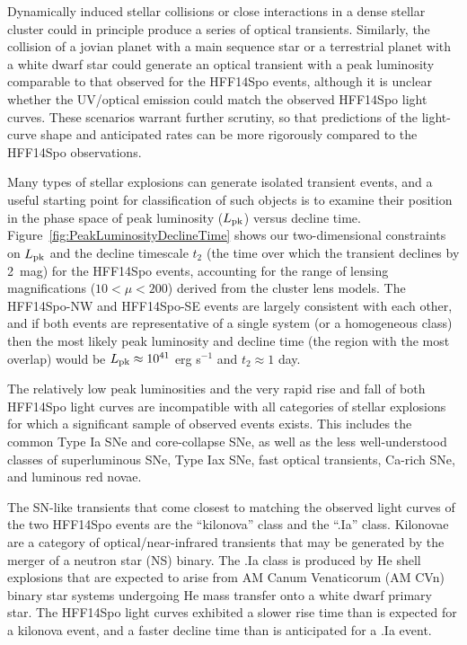 \documentclass{article}
\providecommand\citep{\cite}
\def\spock{HFF14Spo\xspace}
\def\spockone{HFF14Spo-NW\xspace}
\def\spocktwo{HFF14Spo-SE\xspace}
\def\Lpk{\ensuremath{L_{\rm pk}}\xspace}
\def\t2{\ensuremath{t_{2}}\xspace}
\begin{document}

Dynamically induced stellar collisions or close interactions in a
dense stellar cluster\citep{Fregeau:2004} could in principle produce a
series of optical transients. Similarly, the collision of a jovian
planet with a main sequence star\cite{Metzger:2012,Yamazaki:2017} or a
terrestrial planet with a white dwarf star\cite{Di-Stefano:2015} could
generate an optical transient with a peak luminosity comparable to
that observed for the \spock events, although it is unclear whether
the UV/optical emission could match the observed \spock light curves.
These scenarios warrant further scrutiny, so that predictions of the
light-curve shape and anticipated rates can be more rigorously
compared to the \spock observations.

Many types of stellar explosions can generate isolated transient
events, and a useful starting point for classification of such objects
is to examine their position in the phase space of peak luminosity
(\Lpk) versus decline time\cite{Kulkarni:2007}.
Figure~\ref{fig:PeakLuminosityDeclineTime} shows our two-dimensional
constraints on \Lpk and the decline timescale \t2 (the time over which
the transient declines by 2~mag) for the \spock events,
accounting for the range of lensing magnifications ($10<\mu<200$)
derived from the cluster lens models.  The \spockone and \spocktwo
events are largely consistent with each other, and if both events are
representative of a single system (or a homogeneous class) then the
most likely peak luminosity and decline time (the region with the most
overlap) would be $L_{\rm pk}\approx10^{41}$ erg s$^{-1}$ and $t_2\approx1$
day.

The relatively low peak luminosities and the very rapid rise and fall
of both \spock light curves are incompatible with all categories of
stellar explosions for which a significant sample of observed events
exists.  This includes the common Type Ia SNe and core-collapse SNe,
as well as the less well-understood classes of superluminous
SNe\cite{Gal-Yam:2012}, Type Iax SNe\citep{Foley:2013a}, fast optical
transients\cite{Drout:2014}, Ca-rich SNe\cite{Kasliwal:2012}, and
luminous red novae\cite{Kulkarni:2007}.  


The SN-like transients that come closest to matching the observed
light curves of the two \spock events are the ``kilonova'' class and
the ``.Ia'' class.  Kilonovae are a category of optical/near-infrared
transients that may be generated by the merger of a neutron star (NS)
binary\cite{Li:1998, Tanvir:2013, Jin:2016}.  The .Ia class is
produced by He shell explosions that are expected to arise from AM
Canum Venaticorum (AM CVn) binary star systems undergoing He mass
transfer onto a white dwarf primary star\cite{Bildsten:2007}.  The
\spock light curves exhibited a slower rise time than is expected for
a kilonova event\cite{Barnes:2013, Kasen:2015}, and a faster decline
time than is anticipated for a .Ia event\cite{Shen:2010}.
\end{document}
